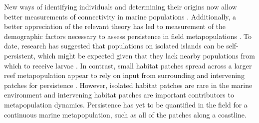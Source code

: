 \documentclass[12pt, oneside]{article}   	%
\begin{document}

New ways of identifying individuals and determining their origins now allow better measurements of connectivity in marine populations \citep{almany2017larval, daloia_self-recruitment_2013}. Additionally, a better appreciation of the relevant theory has led to measurement of the demographic factors necessary to assess persistence in field metapopulations \citep{carson2011evaluating, hameed2016inverse, johnson2018integrating, salles_coral_2015}. To date, research has suggested that populations on isolated islands can be self-persistent, which might be expected given that they lack nearby populations from which to receive larvae \citep{salles_coral_2015}. In contrast, small habitat patches spread across a larger reef metapopulation appear to rely on input from surrounding and intervening patches for persistence \citep{johnson2018integrating}. However, isolated habitat patches are rare in the marine environment and intervening habitat patches are important contributors to metapopulation dynamics. Persistence has yet to be quantified in the field for a continuous marine metapopulation, such as all of the patches along a coastline. 

\end{document}

